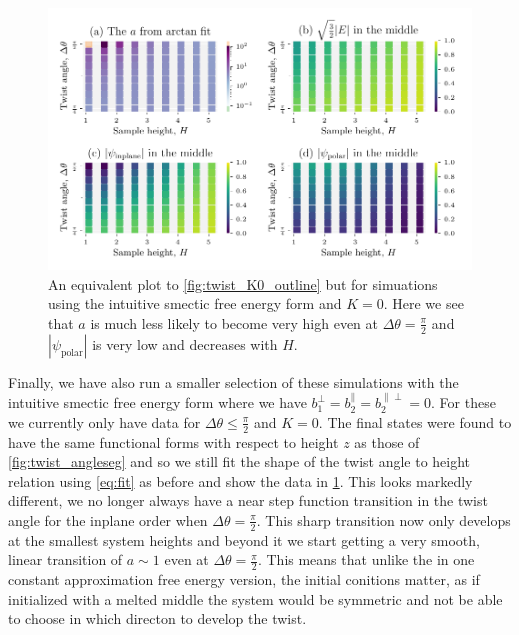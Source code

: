 \documentclass[12pt]{article}
\begin{document}
        \begin{figure}[t!]
            \begin{center}
                \includegraphics{figures/data_plots/twist_outline_POs.pdf}
            \end{center}
            \caption{
                An equivalent plot to \cref{fig:twist_K0_outline} but for simuations using the intuitive smectic free energy form and $K=0$.
                Here we see that $a$ is much less likely to become very high even at $\Delta\theta = \frac{\pi}{2}$ and $|\psi_\text{polar}|$ is very low and decreases with $H$.
            }\label{fig:twist_outline_POs}
        \end{figure}

        Finally, we have also run a smaller selection of these simulations with the intuitive smectic free energy form where we have $b_1^\perp=b_2^\parallel=b_2^{\parallel\perp}=0$.
        For these we currently only have data for $\Delta\theta \leq \frac{\pi}{2}$ and $K=0$.
        The final states were found to have the same functional forms with respect to height $z$ as those of \cref{fig:twist_angleseg} and so we still fit the shape of the twist angle to height relation using \cref{eq:fit} as before and show the data in \cref{fig:twist_outline_POs}.
        This looks markedly different, we no longer always have a near step function transition in the twist angle for the inplane order when $\Delta\theta = \frac{\pi}{2}$.
        This sharp transition now only develops at the smallest system heights and beyond it we start getting a very smooth, linear transition of $a\sim1$ even at $\Delta\theta=\frac{\pi}{2}$.
        This means that unlike the in one constant approximation free energy version, the initial conitions matter, as if initialized with a melted middle the system would be symmetric and not be able to choose in which directon to develop the twist.
\end{document}
